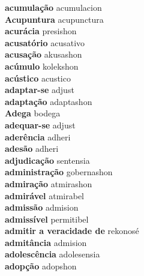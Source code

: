 \textbf{ acumulação  } acumulacion \\
\textbf{ Acupuntura  } acupunctura \\
\textbf{ acurácia  } presishon \\
\textbf{ acusatório  } acusativo \\
\textbf{ acusação  } akusashon \\
\textbf{ acúmulo  } kolekshon \\
\textbf{ acústico  } acustico \\
\textbf{ adaptar-se  } adjust \\
\textbf{ adaptação  } adaptashon \\
\textbf{ Adega  } bodega \\
\textbf{ adequar-se  } adjust \\
\textbf{ aderência  } adheri \\
\textbf{ adesão  } adheri \\
\textbf{ adjudicação  } sentensia \\
\textbf{ administração  } gobernashon \\
\textbf{ admiração  } atmirashon \\
\textbf{ admirável  } atmirabel \\
\textbf{ admissão  } admision \\
\textbf{ admissível  } permitibel \\
\textbf{ admitir a veracidade de  } rekonosé \\
\textbf{ admitância  } admision \\
\textbf{ adolescência  } adolesensia \\
\textbf{ adopção  } adopshon \\
